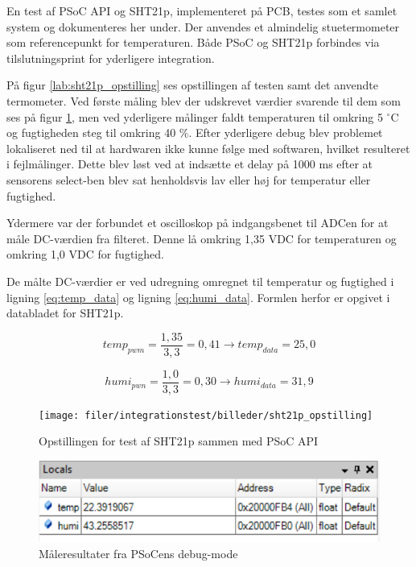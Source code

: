 
En test af PSoC API og SHT21p, implementeret på PCB, testes som et samlet system og dokumenteres her under.
Der anvendes et almindelig stuetermometer som referencepunkt for temperaturen. Både PSoC og SHT21p forbindes via tilslutningsprint for yderligere integration.

På figur \ref{lab:sht21p_opstilling} ses opstillingen af testen samt det anvendte termometer.
Ved første måling blev der udskrevet værdier svarende til dem som ses på figur \ref{lab:sht21p_test_resultat}, men ved yderligere målinger faldt temperaturen til omkring 5 ${^{\circ}}$C og fugtigheden steg til omkring 40 \%. 
Efter yderligere debug blev problemet lokaliseret ned til at hardwaren ikke kunne følge med softwaren, hvilket resulteret i fejlmålinger. Dette blev løst ved at indsætte et delay på 1000 ms efter at sensorens select-ben blev sat henholdsvis lav eller høj for temperatur eller fugtighed.

Ydermere var der forbundet et oscilloskop på indgangsbenet til ADCen for at måle DC-værdien fra filteret. Denne lå omkring 1,35 VDC for temperaturen og omkring 1,0 VDC for fugtighed.  


De målte DC-værdier er ved udregning omregnet til temperatur og fugtighed i ligning \ref{eq:temp_data} og ligning \ref{eq:humi_data}. Formlen herfor er opgivet i databladet for SHT21p.

\begin{equation}
temp_{pwm} = \frac{1,35}{3,3} = 0,41 
\rightarrow temp_{data} = 25,0
\label{eq:temp_data}
\end{equation}

\begin{equation}
humi_{pwn} = \frac{1,0}{3,3} = 0,30 
\rightarrow humi_{data} = 31,9
\label{eq:humi_data}
\end{equation}

\begin{figure}[htb]
  \begin{minipage}{0.48\textwidth}
    \centering
      \texttt{[image: filer/integrationstest/billeder/sht21p\_opstilling]}
      \caption{Opstillingen for test af SHT21p sammen med PSoC API}
    \label{lab:sht21p_opstilling}
  \end{minipage}
  \hspace{0.1\textwidth}
  \begin{minipage}{0.48\textwidth}
    \centering
      \includegraphics[width=\textwidth]{filer/integrationstest/billeder/sht21p_test_resultat}
      \caption{Måleresultater fra PSoCens debug-mode}
    \label{lab:sht21p_test_resultat}
  \end{minipage}
\end{figure}


